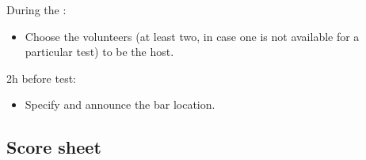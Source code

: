 During the \SetupDays{}:
\begin{itemize}
	\item Choose the volunteers (at least two, in case one is not available for a particular test) to be the host.
\end{itemize}

2h before test:
\begin{itemize}
	\item Specify and announce the bar location.
\end{itemize}

\subsection*{Score sheet}


